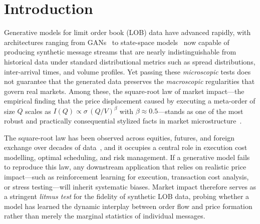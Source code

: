 \documentclass[sigplan,screen,anonymous]{acmart}
\begin{document}


\maketitle

\section{Introduction}

Generative models for limit order book (LOB) data have advanced rapidly, with architectures ranging from GANs~\cite{coletta2023conditional} to state-space models~\cite{nagy2023generative} now capable of producing synthetic message streams that are nearly indistinguishable from historical data under standard distributional metrics such as spread distributions, inter-arrival times, and volume profiles. Yet passing these \emph{microscopic} tests does not guarantee that the generated data preserves the \emph{macroscopic} regularities that govern real markets. Among these, the square-root law of market impact---the empirical finding that the price displacement caused by executing a meta-order of size $Q$ scales as $I(Q) \propto \sigma \, (Q/V)^{\beta}$ with $\beta \approx 0.5$---stands as one of the most robust and practically consequential stylized facts in market microstructure~\cite{bouchaud2018trades, toth2011anomalous, almgren2005direct, lillo2003master}.

The square-root law has been observed across equities, futures, and foreign exchange over decades of data~\cite{torre1997barra, almgren2005direct, toth2011anomalous}, and it occupies a central role in execution cost modelling, optimal scheduling, and risk management. If a generative model fails to reproduce this law, any downstream application that relies on realistic price impact---such as reinforcement learning for execution, transaction cost analysis, or stress testing---will inherit systematic biases. Market impact therefore serves as a stringent \emph{litmus test} for the fidelity of synthetic LOB data, probing whether a model has learned the dynamic interplay between order flow and price formation rather than merely the marginal statistics of individual messages.
\end{document}
